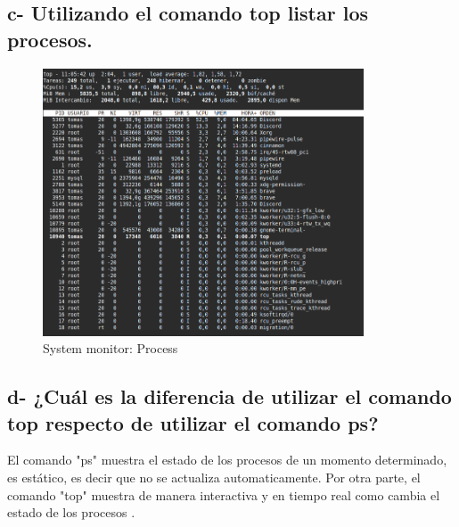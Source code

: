 \documentclass{article}
\begin{document}
\subsection*{c- Utilizando el comando top listar los procesos.}
\begin{figure}[h]
  \centering
  \includegraphics[width=0.85\textwidth]{resources/4c.png}
  \caption{System monitor: Process}
\end{figure}
\subsection*{d- ¿Cuál es la diferencia de utilizar el comando top respecto de utilizar el comando ps?}
El comando "ps" muestra el estado de los procesos de un momento determinado, es estático, es decir que no se actualiza automaticamente.
Por otra parte, el comando "top" muestra de manera interactiva y en tiempo real como cambia el estado de los procesos .
\end{document}
